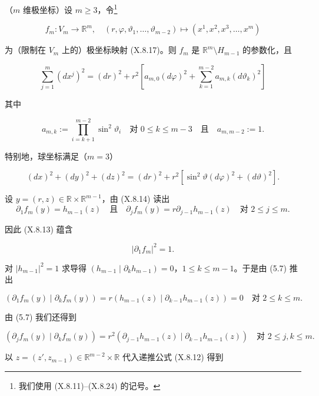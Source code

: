 \begin{example}
\begin{items}
（$ m $ 维极坐标）设 $ m \ge 3 $，令\footnote{我们使用 (X.8.11)–(X.8.24) 的记号。}

\[
f_{m}: V_{m} \to \mathbb{R}^{m} , \quad (r, \varphi, \vartheta_{1}, \ldots, \vartheta_{m-2}) \mapsto (x^{1}, x^{2}, x^{3}, \ldots, x^{m})
\]

为（限制在 $ V_{m} $ 上的）极坐标映射 (X.8.17)。则 $ f_{m} $ 是 $ \mathbb{R}^{m} \setminus H_{m-1} $ 的参数化，且

\[
\sum_{j=1}^{m} (dx^{j})^{2} = (dr)^{2} + r^{2}\left[ a_{m,0}(d\varphi)^{2} + \sum_{k=1}^{m-2} a_{m,k}(d\vartheta_{k})^{2} \right]
\]

其中

\[
a_{m,k} := \prod_{i=k+1}^{m-2} \sin^{2}\vartheta_{i} \quad \text{对 } 0 \le k \le m-3 \quad \text{且} \quad a_{m,m-2} := 1 .
\]

特别地，球坐标满足（$ m = 3 $）

\[
(dx)^{2} + (dy)^{2} + (dz)^{2} = (dr)^{2} + r^{2}\left[\sin^{2}\vartheta (d\varphi)^{2} + (d\vartheta)^{2}\right] .
\]

\proofhead
设 $ y = (r, z) \in \mathbb{R} \times \mathbb{R}^{m-1} $，由 (X.8.14) 读出
\begin{equation}
\partial_{1}f_{m}(y) = h_{m-1}(z) \quad \text{且} \quad \partial_{j}f_{m}(y) = r\partial_{j-1}h_{m-1}(z) \quad \text{对 } 2 \le j \le m .\tag{5.7}
\end{equation}

因此 (X.8.13) 蕴含

\begin{equation}
|\partial_{1}f_{m}|^{2} = 1 .\tag{5.8}
\end{equation}

对 $ |h_{m-1}|^{2} = 1 $ 求导得 $ (h_{m-1} \mid \partial_{k}h_{m-1}) = 0 $，$ 1 \le k \le m-1 $。于是由 (5.7) 推出

\begin{equation}
(\partial_{1}f_{m}(y) \mid \partial_{k}f_{m}(y)) = r(h_{m-1}(z) \mid \partial_{k-1}h_{m-1}(z)) = 0 \quad \text{对 } 2 \le k \le m .\tag{5.9}
\end{equation}

由 (5.7) 我们还得到

\begin{equation}
(\partial_{j}f_{m}(y) \mid \partial_{k}f_{m}(y)) = r^{2}(\partial_{j-1}h_{m-1}(z) \mid \partial_{k-1}h_{m-1}(z)) \quad \text{对 } 2 \le j, k \le m .\tag{5.10}
\end{equation}

以 $ z = (z', z_{m-1}) \in \mathbb{R}^{m-2} \times \mathbb{R} $ 代入递推公式 (X.8.12) 得到


\end{items}
\end{example}
